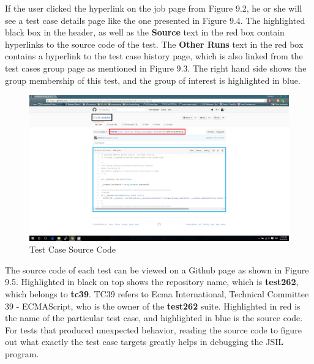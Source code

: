 \documentclass[a4paper,11pt,twoside]{report}
\begin{document}
If the user clicked the hyperlink on the job page from Figure 9.2, he or she will see a test case details page like the one presented in Figure 9.4. The highlighted black box in the header, as well as the \textbf{Source} text in the red box contain hyperlinks to the source code of the test. The \textbf{Other Runs} text in the red box contains a hyperlink to the test case history page, which is also linked from the test cases group page as mentioned in Figure 9.3. The right hand side shows the group membership of this test, and the group of interest is highlighted in blue.

\begin{figure}[h!]
  \caption{Test Case Source Code}
  \includegraphics[width=1.0\textwidth]{source_testing_screen_boxed}
\end{figure}

The source code of each test can be viewed on a Github page as shown in Figure 9.5. Highlighted in black on top shows the repository name, which is \textbf{test262}, which belongs to \textbf{tc39}. TC39 refers to Ecma International, Technical Committee 39 - ECMAScript, who is the owner of the \textbf{test262} suite. Highlighted in red is the name of the particular test case, and highlighted in blue is the source code. For tests that produced unexpected behavior, reading the source code to figure out what exactly the test case targets greatly helps in debugging the JSIL program.

\end{document}
